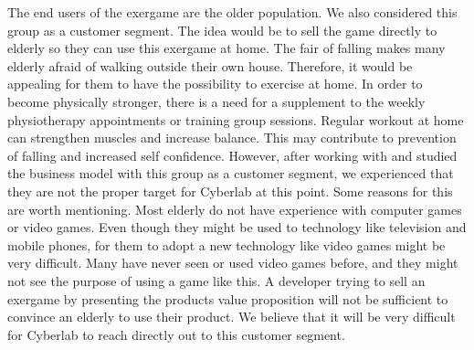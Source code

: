 The end users of the exergame are the older population. We also considered this group as a customer segment. The idea would be to sell the game directly to elderly so they can use this exergame at home. The fair of falling makes many elderly afraid of walking outside their own house. Therefore, it would be appealing for them to have the possibility to exercise at home. In order to become physically stronger, there is a need for a supplement to the weekly physiotherapy appointments or training group sessions. Regular workout at home can strengthen muscles and increase balance.  This may contribute to prevention of falling and increased self confidence. However, after working with and studied the business model with this group as a customer segment, we experienced that they are not the proper target for Cyberlab at this point. Some reasons for this are worth mentioning. Most elderly do not have experience with computer games or video games. Even though they might be used to technology like television and mobile phones, for them to adopt a new technology like video games might be very difficult. Many have never seen or used video games before, and they might not see the purpose of using a game like this. A developer trying to sell an exergame by presenting the products value proposition will not be sufficient to convince an elderly to use their product. We believe that it will be very difficult for Cyberlab to reach directly out to this customer segment. 


